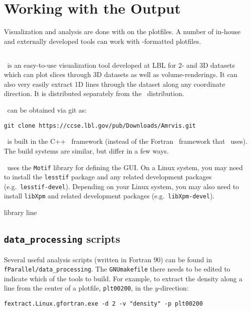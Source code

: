 \section{Working with the Output}

Visualization and analysis are done with on the plotfiles.  A
number of in-house and externally developed tools can work 
with \boxlib-formatted plotfiles.


\subsection{\amrvis}

\amrvis\ is an easy-to-use visualization tool developed at LBL for
2- and 3D datasets which can plot slices through 3D datasets as well
as volume-renderings.  It can also very easily extract 1D lines
through the dataset along any coordinate direction.  It is distributed
separately from the \maestro\ distribution.

\amrvis\ can be obtained via git as:
\begin{verbatim}
git clone https://ccse.lbl.gov/pub/Downloads/Amrvis.git
\end{verbatim}
\amrvis\ is built in the C++ \boxlib\ framework (instead of the Fortran 
\boxlib\ framework that \maestro\ uses).  The build systems are similar,
but differ in a few ways.  

\amrvis\ uses the {\tt Motif} library for defining the GUI.  On a Linux 
system, you may need to install the {\tt lesstif} package and any
related development packages (e.g.\ {\tt lesstif-devel}).  Depending
on your Linux system, you may also need to install {\tt libXpm} 
and related development packages (e.g.\ {\tt libXpm-devel}).


library line


\subsection{{\tt data\_processing} scripts}

Several useful analysis scripts (written in Fortran 90) can be found
in {\tt fParallel/data\_processing}.  The {\tt GNUmakefile} there
needs to be edited to indicate which of the tools to build.  For
example, to extract the density along a line from the center of a
plotfile, {\tt plt00200}, in the $y$-direction:

\begin{verbatim}
fextract.Linux.gfortran.exe -d 2 -v "density" -p plt00200
\end{verbatim}

